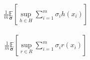 \documentclass{article}
\begin{document}

\begin{equation}
    \begin{aligned}
        \frac{1}{m} \underset{\bm{\sigma}}{\mathbb{E}}\left[\sup _{h \in H} \sum_{i=1}^{m} \sigma_{i}  h(x_i) \right]
    \end{aligned}
\end{equation}


\begin{equation}
    \begin{aligned}
        \frac{1}{m} \underset{\bm{\sigma}}{\mathbb{E}}\left[\sup _{r \in R} \sum_{i=1}^{m} \sigma_{i}  r(x_i) \right]
    \end{aligned}
\end{equation}









\newpage



\nocite*{}
\end{document}
